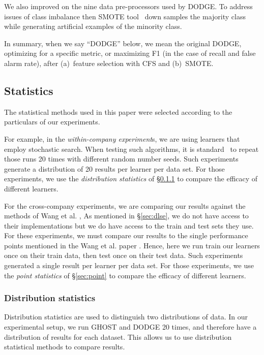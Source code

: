 \documentclass[10pt,compsoc,twocolumn]{IEEEtran}
\begin{document}
We also improved on the   nine data pre-processors used by DODGE. To address issues of class imbalance then SMOTE tool~\cite{Chawla02} down samples the majority class while  generating artificial examples of the minority class.

In summary, when we say ``DODGE'' below, we mean the original DODGE, optimizing for a specific metric, or maximizing F1 (in the case of recall and false alarm rate), after  (a)~feature selection with CFS and (b)~SMOTE. 

\subsection{Statistics}
\label{sec:stats}

The statistical methods used in this paper were selected according to the particulars of our experiments.

For example, in  the {\em within-company experiment}s,  we are using learners that employ stochastic search. When testing such algorithms, it is standard~\cite{arcuri11} to repeat  those runs 20 times with different random number
seeds. Such  experiments generate a distribution of  20 results per learner per data set.
 For those experiments, we use
 the {\em distribution  statistics} of \S\ref{sec:dist}
 to compare the efficacy
 of different learners.
 
 For the cross-company experiments, we are comparing our results against the methods of Wang et al. \cite{wang2016automatically},
 As mentioned in \S\ref{sec:dlse},  we do not have access to their implementations but we do have access to the train and test sets they use. For
 these experiments, we must compare our results to the single performance points mentioned in the  Wang et al. paper \cite{wang2016automatically}.  Hence, here we run train our learners once on their train data, then test once on their test data.
 Such  experiments generated a single result  per learner per data set.
 For those experiments, we use the {\em point  statistics}
 of \S\ref{sec:point}
 to compare the efficacy
 of different learners.
 
 

\subsubsection{Distribution statistics}\label{sec:dist}

Distribution statistics \cite{arcuri13parameterto, ghotra2015revisiting} are used to distinguish two distributions of data. In our experimental setup, we run GHOST and DODGE 20 times, and therefore have a distribution of results for each dataset. This allows us to use distribution statistical methods to compare results.
\end{document}
